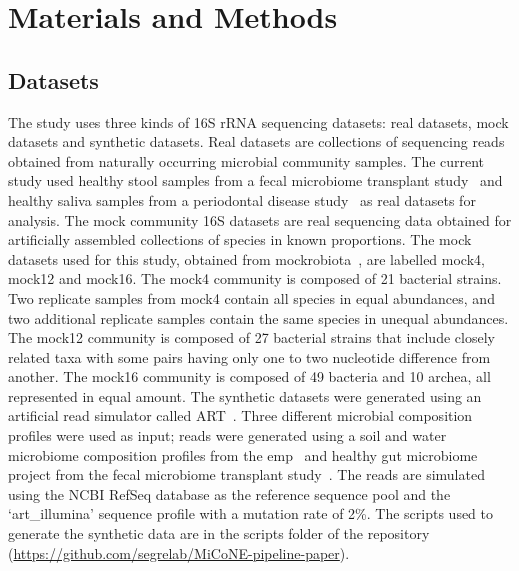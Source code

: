 
\section*{Materials and Methods}

  \subsection*{Datasets}

  \vspace{-5mm}
  The study uses three kinds of 16S rRNA sequencing datasets: real datasets, mock datasets and synthetic datasets.
  Real datasets are collections of sequencing reads obtained from naturally occurring microbial community samples.
  The current study used healthy stool samples from a fecal microbiome transplant study~\cite{Kang2017} and healthy saliva samples from a periodontal disease study~\cite{Chen2018} as real datasets for analysis.
  The mock community 16S datasets are real sequencing data obtained for artificially assembled collections of species in known proportions.
  The mock datasets used for this study, obtained from mockrobiota~\cite{Bokulich2016}, are labelled mock4, mock12 and mock16.
  The mock4 community is composed of 21 bacterial strains.
  Two replicate samples from mock4  contain all species in equal abundances, and two additional replicate samples contain the same species in unequal abundances.
  The mock12 community is composed of 27 bacterial strains that include closely related taxa with some pairs having only one to two nucleotide difference from another.
  The mock16 community is composed of 49 bacteria and 10 archea, all represented in equal amount.
  The synthetic datasets were generated using an artificial read simulator called ART~\cite{Huang2012}.
  Three different microbial composition profiles were used as input; reads were generated using a soil and water microbiome composition profiles from the \ac{emp}~\cite{Thompson2017} and healthy gut microbiome project from the fecal microbiome transplant study~\cite{Kang2017}.
  The reads are simulated using the NCBI RefSeq database as the reference sequence pool and the `art\_illumina' sequence profile with a mutation rate of 2\%.
  The scripts used to generate the synthetic data are in the scripts folder of the repository (\href{https://github.com/segrelab/MiCoNE-pipeline-paper}{https://github.com/segrelab/MiCoNE-pipeline-paper}).

